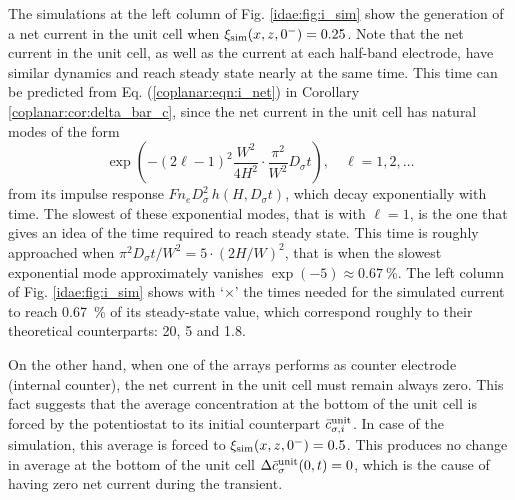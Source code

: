 The simulations at the left column of Fig. \ref{idae:fig:i_sim} show
the generation of a net current in the unit cell when $\xi_{\mathrm{sim}}(x,z,0^{-}) = \num{0,25}$.
Note that the net current in the unit cell,
as well as the current at each half-band electrode,
have similar dynamics and reach steady state nearly at the same time.
This time can be predicted from Eq. (\ref{coplanar:eqn:i_net}) in Corollary \ref{coplanar:cor:delta_bar_c},
since the net current in the unit cell has natural modes of the form
\begin{equation}
	\label{idae:eqn:tau:extC}
	\exp\!\left( -(2\ell - 1)^{2} \frac{W^{2}}{4H^{2}} \cdot \frac{\pi^{2}}{W^{2}} D_{\sigma} t \right),\quad \ell = 1,2,\ldots
\end{equation}
from its impulse response $F n_{e} D_{\sigma}^{2}\, h(H,D_{\sigma}t)$, which decay exponentially with time.
The slowest of these exponential modes, that is with $\ell=1$,
is the one that gives an idea of the time required to reach steady state.
This time is roughly approached when $\pi^{2} D_{\sigma} t/W^{2} = 5 \cdot (2H/W)^{2}$,
that is when the slowest exponential mode approximately vanishes $\exp(-5) \approx \SI{0,67}{\percent}$.
The left column of Fig. \ref{idae:fig:i_sim} shows with `$\times$'
the times needed for the simulated current to reach \SI{0,67}{\percent} of its steady-state value,
which correspond roughly to their theoretical counterparts: 20, 5 and \num{1,8}.

On the other hand, when one of the arrays performs as counter electrode (internal counter),
the net current in the unit cell must remain always zero.
This fact suggests that the average concentration at the bottom of the unit cell
is forced by the potentiostat to its initial counterpart $\bar{c}_{\sigma,i}^{\text{unit}}$.
In case of the simulation,
this average is forced to $\xi_{\mathrm{sim}}(x,z,0^{-}) = \num{0,5}$.
This produces no change in average at the bottom of the unit cell
$\Delta \bar{c}_{\sigma}^{\text{unit}}(0,t) = 0$,
which is the cause of having zero net current during the transient.

